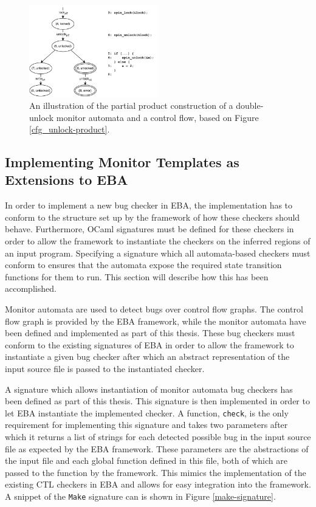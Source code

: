 \begin{figure}[H]
    \centering
    \includegraphics[width=0.5\textwidth]{implementation/figures/cfg_unlock-product-partial}
    \caption{An illustration of the partial product construction of a double-unlock monitor automata and a control flow, based on Figure \ref{cfg_unlock-product}.}
    \label{cfg_unlock-product-partial}
\end{figure}

\subsection{Implementing Monitor Templates as Extensions to EBA}
\label{integration-into-eba}

\noindent In order to implement a new bug checker in EBA, the implementation has to conform to the structure set up by the framework of how these checkers should behave. Furthermore, OCaml signatures must be defined for these checkers in order to allow the framework to instantiate the checkers on the inferred regions of an input program. Specifying a signature which all automata-based checkers must conform to ensures that the automata expose the required state transition functions for them to run. This section will describe how this has been accomplished.  

\newpar Monitor automata are used to detect bugs over control flow graphs. The control flow graph is provided by the EBA framework, while the monitor automata have been defined and implemented as part of this thesis. These bug checkers must conform to the existing signatures of EBA in order to allow the framework to instantiate a given bug checker after which an abstract representation of the input source file is passed to the instantiated checker. 

\newpar A signature which allows instantiation of monitor automata bug checkers has been defined as part of this thesis. This signature is then implemented in order to let EBA instantiate the implemented checker. A function, \texttt{check}, is the only requirement for implementing this signature and takes two parameters after which it returns a list of strings for each detected possible bug in the input source file as expected by the EBA framework. These parameters are the abstractions of the input file and each global function defined in this file, both of which are passed to the function by the framework. This mimics the implementation of the existing CTL checkers in EBA and allows for easy integration into the framework. A snippet of the \texttt{Make} signature can is shown in Figure \ref{make-signature}.

